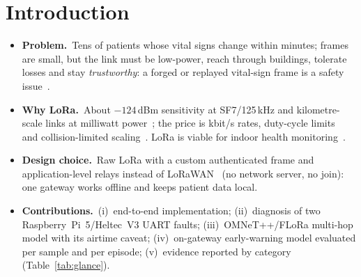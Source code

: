 \documentclass[10pt,a4paper]{article}
\newcommand{\lead}[1]{\textbf{#1}\,}
\begin{document}
\section{Introduction}
\begin{itemize}
\item \lead{Problem.} Tens of patients whose vital signs change within minutes; frames are small, but the link must be low-power, reach through buildings, tolerate losses and stay \emph{trustworthy}: a forged or replayed vital-sign frame is a safety issue~\cite{islam2015iot}.
\item \lead{Why LoRa.} About $-124$\,dBm sensitivity at SF7/125\,kHz and kilometre-scale links at milliwatt power~\cite{augustin2016lora}; the price is kbit/s rates, duty-cycle limits~\cite{etsi300220,adelantado2017limits} and collision-limited scaling~\cite{bor2016scale}. LoRa is viable for indoor health monitoring~\cite{petajajarvi2017health}.
\item \lead{Design choice.} Raw LoRa with a custom authenticated frame and application-level relays instead of LoRaWAN~\cite{lorawan104} (no network server, no join): one gateway works offline and keeps patient data local.
\item \lead{Contributions.} (i)~end-to-end implementation; (ii)~diagnosis of two Raspberry~Pi~5/Heltec~V3 UART faults; (iii)~OMNeT++/FLoRa multi-hop model with its airtime caveat; (iv)~on-gateway early-warning model evaluated per sample and per episode; (v)~evidence reported by category (Table~\ref{tab:glance}).
\end{itemize}

\end{document}
